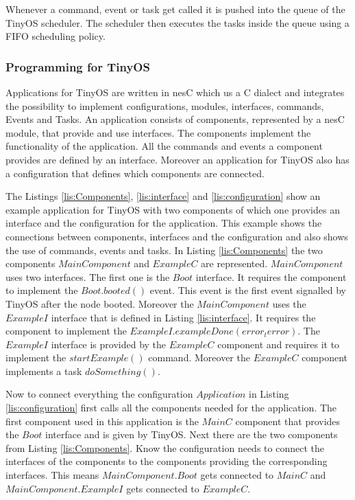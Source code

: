 Whenever a command, event or task get called it is pushed into the queue of the TinyOS scheduler. The scheduler then executes the tasks inside the queue using a FIFO scheduling policy.    

\subsubsection{Programming for TinyOS}
Applications for TinyOS are written in nesC which us a C dialect and integrates the possibility to implement configurations, modules, interfaces, commands, Events and Tasks. An application consists of components, represented by a nesC module, that provide and use interfaces. The components implement the functionality of the application. All the commands and events a component provides are defined by an interface. Moreover an application for TinyOS also has a configuration that defines which components are connected.   

The Listings \ref{lis:Components}, \ref{lis:interface} and \ref{lis:configuration} show an example application for TinyOS with two components of which one provides an interface and the configuration for the application. This example shows the connections between components, interfaces and the configuration and also shows the use of commands, events and tasks. In Listing \ref{lis:Components} the two components $MainComponent$ and $ExampleC$ are represented. $MainComponent$ uses two interfaces. The first one is the $Boot$ interface. It requires the component to implement the $Boot.booted()$ event. This event is the first event signalled by TinyOS after the node booted. Moreover the $MainComponent$ uses the $ExampleI$ interface that is defined in Listing \ref{lis:interface}. It requires the component to implement the $ExampleI.exampleDone(error_t error)$. The $ExampleI$ interface is provided by the $ExampleC$ component and requires it to implement the $startExample()$ command. Moreover the $ExampleC$ component implements a task $doSomething()$.

Now to connect everything the configuration $Application$ in Listing \ref{lis:configuration} first calls all the components needed for the application. The first component used in this application is the $MainC$ component that provides the $Boot$ interface and is given by TinyOS. Next there are the two components from Listing \ref{lis:Components}. Know the configuration needs to connect the interfaces of the components to the components providing the corresponding interfaces. This means $MainComponent.Boot$ gets connected to $MainC$ and $MainComponent.ExampleI$ gets connected to $ExampleC$.

